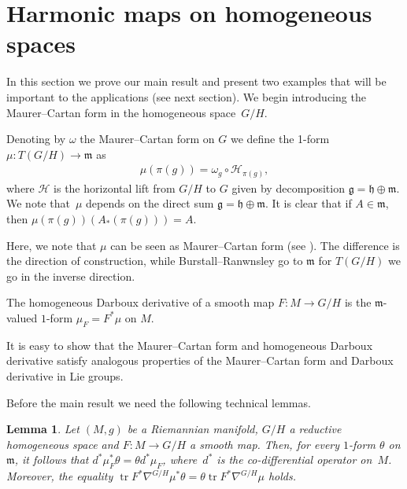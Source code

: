 \documentclass[pdftex]{sigma}
\numberwithin{equation}{section}
\newtheorem{Lemma}[Theorem]{Lemma}
\newcommand{\g}{\mathfrak{g}}
\newcommand{\m}{\mathfrak{m}}
\newcommand{\h}{\mathfrak{h}}
\begin{document}
\section{Harmonic maps on homogeneous spaces}\label{section3}

In this section we prove our main result and present two examples that will be important to the applications (see next section). We begin introducing the Maurer--Cartan form in the homogeneous space~$G/H$.

Denoting by $\omega$ the Maurer--Cartan form on $G$ we def\/ine the 1-form $\mu\colon T(G/H) \rightarrow \m$ as
\begin{gather*}%
 \mu(\pi(g)) = \omega_{g} \circ \mathcal{H}_{\pi(g)},
\end{gather*}
where $\mathcal{H}$ is the horizontal lift from $G/H$ to $G$ given by decomposition $\g = \h \oplus \m$.  We note that~$\mu$ depends on the direct sum $\g = \h \oplus \m$. It is clear that if $A \in \m$, then $\mu(\pi(g))(A_{*}(\pi(g)))= A$.

\begin{Remark}
  Here, we note that $\mu$  can be  seen as   Maurer--Cartan form (see  \cite[Chapter~1]{BurstallF/RanwnsleyJ}). The dif\/ference is the direction of construction, while Burstall--Ranwnsley go to $\m$ for $T(G/H)$ we go in the inverse direction.
\end{Remark}

\begin{Definition}
  The homogeneous Darboux derivative of a smooth map $F\colon M \rightarrow G/H$ is the $\m$-valued $1$-form $\mu_F = F^*\mu$ on $M$.
\end{Definition}

It is  easy to show that the Maurer--Cartan form and homogeneous Darboux derivative satisfy analogous properties of the Maurer--Cartan form and Darboux derivative in Lie groups.

Before the main result we need the following technical lemmas.

\begin{Lemma}\label{le3}
  Let $(M,g)$ be a Riemannian manifold, $G/H$ a reductive homogeneous space and $F\colon M \rightarrow G/H$ a smooth map. Then, for every $1$-form $\theta$ on $\mathfrak{m}$, it follows that $d^{*}\mu_{F}^{*}\theta =  \theta d^{*}\mu_{F}$, where~$d^{*}$ is the co-differential operator on~$M$. Moreover,
  the equality $\operatorname{tr}F^*\nabla^{G/H}\mu^{*}\theta = \theta \operatorname{tr}F^*\nabla^{G/H}\mu$ holds.
\end{Lemma}
\end{document}

